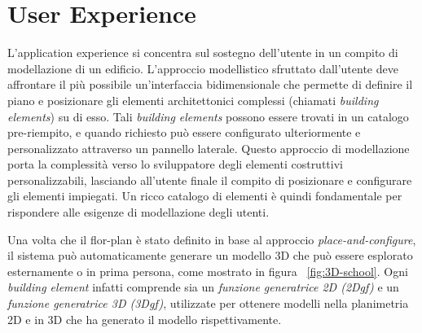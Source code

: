 \section{User Experience}
\label{sec:chapter_2_section_5}


L'application experience si concentra sul sostegno dell'utente in un compito di modellazione di un edificio.
L'approccio modellistico sfruttato dall'utente deve affrontare il pi\`u possibile un'interfaccia bidimensionale che permette
di definire il piano e posizionare gli elementi architettonici complessi (chiamati \emph{building elements}) su di esso.
Tali \emph{building elements} possono essere trovati in un catalogo pre-riempito, e quando richiesto pu\`o essere
configurato ulteriormente e personalizzato attraverso un pannello laterale. Questo approccio
di modellazione porta la complessit\`a verso lo sviluppatore degli elementi costruttivi personalizzabili,
lasciando all'utente finale il compito di posizionare e configurare gli elementi impiegati.
Un ricco catalogo di elementi \`e quindi fondamentale per rispondere alle esigenze di modellazione degli utenti.


Una volta che il flor-plan \`e stato definito in base al approccio \emph{place-and-configure}, il sistema pu\`o automaticamente
generare un modello 3D che pu\`o essere esplorato esternamente o in prima persona, come mostrato in figura ~\ref{fig:3D-school}.
Ogni \emph{building element} infatti comprende sia un \emph{funzione generatrice 2D (2Dgf)} e un
\emph{funzione generatrice 3D (3Dgf)}, utilizzate per ottenere modelli nella planimetria 2D e in 3D che ha generato il modello
rispettivamente.

